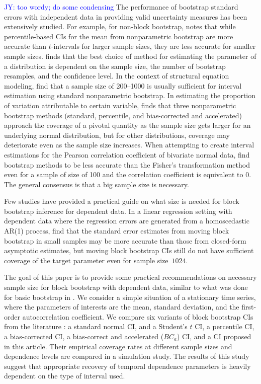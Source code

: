 \documentclass[12pt, letterpaper, titlepage]{article}
\newcommand{\jy}[1]{\textcolor{blue}{JY: #1}}
\begin{document}
\jy{too wordy; do some condensing}
The performance of bootstrap standard errors with independent data
in providing valid uncertainty measures has been extensively studied.
For example, for non-block bootstrap, \citet{hesterberg2015teachers} notes
that while percentile-based CIs for the mean from nonparametric bootstrap
are more accurate than $t$-intervals for larger sample sizes, they are
less accurate for smaller sample sizes. \citet{chernick2009revisiting} finds 
that the best choice of method for estimating
the parameter of a distribution is dependent on the sample size, the number of
bootstrap resamples, and the confidence level. In the context of structural
equation modeling, \citet{nevitt2001performance} find
that a sample size of 200--1000 is usually sufficient for interval estimation
using standard nonparametric bootstrap. In estimating the proportion of 
variation attributable to certain variable, \citet{burch2012nonparametric} finds
that three nonparametric bootstrap methods (standard, percentile, and 
bias-corrected
and accelerated) approach the coverage of a pivotal quantity as the sample size
gets larger for an underlying normal distribution, but for other distributions, 
coverage may deteriorate even as the sample size increases.
When attempting to create interval estimations for the Pearson correlation 
coefficient of bivariate normal data, \citet{puth2015variety} find bootstrap 
methods to be less accurate than the Fisher's transformation method even 
for a sample of size of 100 and the correlation coefficient is equivalent to 0.
The general consensus is that a big sample size is necessary.


Few studies have provided a practical guide on what size is needed
for block bootstrap inference for dependent data.
In a linear regression setting with dependent data where the
regression errors are generated from a homoscedastic AR(1) process, 
\citet{goncalves2005bootstrap} find that the standard error estimates from
moving block bootstrap in small samples may be more accurate than those
from closed-form asymptotic estimates, but moving block bootstrap 
CIs still do not have sufficient coverage of the target parameter even for
sample size~$1024$.


The goal of this paper is to provide some practical recommendations on
necessary sample size for block bootstrap with dependent data, similar to what 
was done for basic bootstrap in \citet{hesterberg2015teachers}. We consider a
simple situation of a stationary time series, where the parameters of
interests are the mean, standard deviation, and the first-order
autocorrelation coefficient. We compare six variants of block bootstrap
CIs from the literature \citep{diciccio1996bootstrap,
  rice2006mathematical}: a standard normal CI, and a Student's $t$ CI,
a percentile CI, a bias-corrected CI, a bias-correct and accelerated ($BC_a$)
CI, and a CI proposed in this article. Their
empirical coverage rates at different sample sizes and dependence levels are
compared in a simulation study. The results of this study suggest that
appropriate recovery of temporal dependence parameters is heavily dependent
on the type of interval used.
\end{document}
